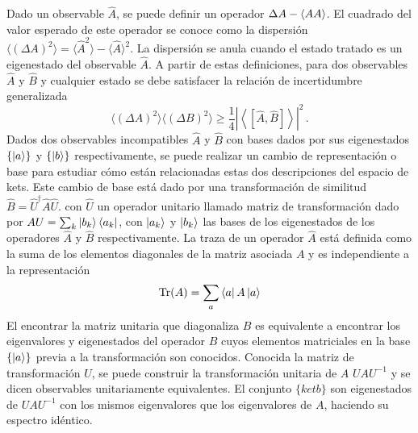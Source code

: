 Dado un observable $\hat{A}$, se puede definir un operador $\Delta A \def \hat{A} - \langle \hat{A} \rangle$. El cuadrado del valor esperado de este operador se conoce como la dispersión $\langle (\Delta A)^2 \rangle = \langle \hat{A}^2\rangle  - \langle\hat{A}\rangle^2$. La dispersión se anula cuando el estado tratado es un eigenestado del observable $\hat{A}$. A partir de estas definiciones, para dos observables $\hat{A}$ y $\hat{B}$ y cualquier estado se debe satisfacer la relación de incertidumbre generalizada \cite{Sakurai}
\begin{equation}
  \label{1.4}
  \langle (\Delta A)^2 \rangle \langle (\Delta B)^2 \rangle \geq \frac{1}{4} \left| \left\langle \left[ \hat{A}, \hat{B} \right] \right\rangle  \right|^2 \,.
\end{equation}
Dados dos observables incompatibles $\hat{A}$ y $\hat{B}$ con bases dados por sus eigenestados $\left\{\ket{a}\right\}$ y $\left\{\ket{b}\right\}$ respectivamente, se puede realizar un cambio de representación o base para estudiar cómo están relacionadas estas dos descripciones del espacio de kets. Este cambio de base está dado por una transformación de similitud $\hat{B} = \hat{U}^\dagger \hat{A} \hat{U}$. con $\hat{U}$ un operador unitario llamado matriz de transformación dado por $\hat{U} = \sum_k \ket{b_k}\bra{a_k}$, con $\ket{a_k}$ y $\ket{b_k}$ las bases de los eigenestados de los operadores $\hat{A}$ y $\hat{B}$ respectivamente. La traza de un operador $\hat{A}$ está definida como la suma de los elementos diagonales de la matriz asociada $A$ y es independiente a la representación
\begin{equation}
  \text{Tr}(A) = \sum_a \bra{a}A\ket{a}
\end{equation}
El encontrar la matriz unitaria que diagonaliza $B$ es equivalente a encontrar los eigenvalores y eigenestados del operador $B$ cuyos elementos matriciales en la base $\{\ket{a}\}$ previa a la transformación son conocidos. Conocida la matriz de transformación $U$, se puede construir la transformación unitaria de $A$ $UAU^{-1}$ y se dicen observables unitariamente equivalentes. El conjunto $\{ket{b}\}$ son eigenestados de $UAU^{-1}$ con los mismos eigenvalores que los eigenvalores de $A$, haciendo su espectro idéntico.
